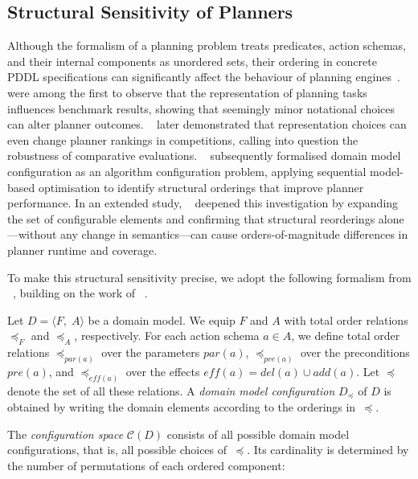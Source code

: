 \subsection{Structural Sensitivity of Planners}
\label{sec:bg:sensitivity}

Although the formalism of a planning problem treats predicates, action schemas, and their internal components as unordered sets, their ordering in concrete PDDL specifications can significantly affect the behaviour of planning engines~\cite{HoweDahlman2002, RiddleHolteBarley2011}.
\citeauthor{HoweDahlman2002}~\cite{HoweDahlman2002} were among the first to observe that the representation of planning tasks influences benchmark results, showing that seemingly minor notational choices can alter planner outcomes.
\citeauthor{RiddleHolteBarley2011}~\cite{RiddleHolteBarley2011} later demonstrated that representation choices can even change planner rankings in competitions, calling into question the robustness of comparative evaluations.
\citeauthor{Vallati2015}~\cite{Vallati2015} subsequently formalised domain model configuration as an algorithm configuration problem, applying sequential model-based optimisation to identify structural orderings that improve planner performance.
In an extended study, \citeauthor{Vallati2021}~\cite{Vallati2021} deepened this investigation by expanding the set of configurable elements and confirming that structural reorderings alone---without any change in semantics---can cause orders-of-magnitude differences in planner runtime and coverage.

To make this structural sensitivity precise, we adopt the following formalism from \citeauthor{Georgievski2025}~\cite{Georgievski2025}, building on the work of \citeauthor{Vallati2021}~\cite{Vallati2021}.

Let $D = \langle F,\; A \rangle$ be a domain model.
We equip $F$ and $A$ with total order relations $\preceq_F$ and $\preceq_A$, respectively.
For each action schema $a \in A$, we define total order relations $\preceq_{\mathit{par}(a)}$ over the parameters $\mathit{par}(a)$, $\preceq_{\mathit{pre}(a)}$ over the preconditions $\mathit{pre}(a)$, and $\preceq_{\mathit{eff}(a)}$ over the effects $\mathit{eff}(a) = \mathit{del}(a) \cup \mathit{add}(a)$.
Let $\preceq$ denote the set of all these relations.
A \emph{domain model configuration} $D_{\preceq}$ of $D$ is obtained by writing the domain elements according to the orderings in~$\preceq$.

The \emph{configuration space} $\mathcal{C}(D)$ consists of all possible domain model configurations, that is, all possible choices of~$\preceq$.
Its cardinality is determined by the number of permutations of each ordered component:

